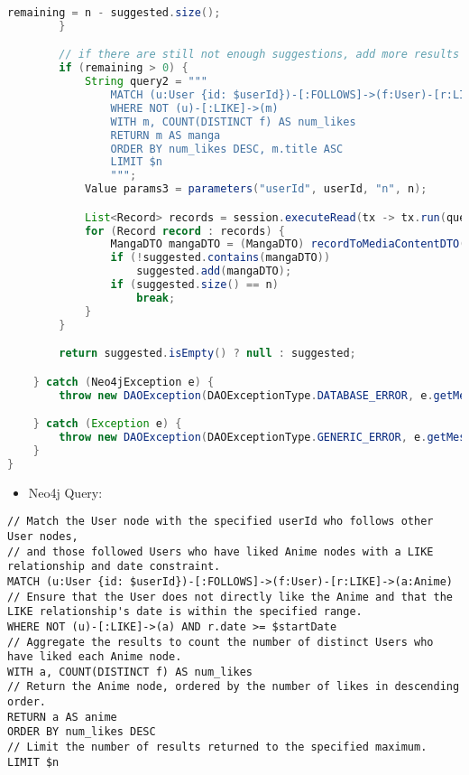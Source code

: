 \begin{mdframed}[style=customstyle]
\begin{lstlisting}[language=java]
            remaining = n - suggested.size();
        }

        // if there are still not enough suggestions, add more results based on all likes
        if (remaining > 0) {
            String query2 = """
                MATCH (u:User {id: $userId})-[:FOLLOWS]->(f:User)-[r:LIKE]->(m:Manga)
                WHERE NOT (u)-[:LIKE]->(m)
                WITH m, COUNT(DISTINCT f) AS num_likes
                RETURN m AS manga
                ORDER BY num_likes DESC, m.title ASC
                LIMIT $n
                """;
            Value params3 = parameters("userId", userId, "n", n);

            List<Record> records = session.executeRead(tx -> tx.run(query2, params3).list());
            for (Record record : records) {
                MangaDTO mangaDTO = (MangaDTO) recordToMediaContentDTO(record);
                if (!suggested.contains(mangaDTO))
                    suggested.add(mangaDTO);
                if (suggested.size() == n)
                    break;
            }
        }

        return suggested.isEmpty() ? null : suggested;

    } catch (Neo4jException e) {
        throw new DAOException(DAOExceptionType.DATABASE_ERROR, e.getMessage());

    } catch (Exception e) {
        throw new DAOException(DAOExceptionType.GENERIC_ERROR, e.getMessage());
    }
}\end{lstlisting}
\end{mdframed}

\begin{itemize}
    \item Neo4j Query:
\end{itemize}

\begin{mdframed}[style=customstyle]
\begin{lstlisting}[language=Cypher]
// Match the User node with the specified userId who follows other User nodes,
// and those followed Users who have liked Anime nodes with a LIKE relationship and date constraint.
MATCH (u:User {id: $userId})-[:FOLLOWS]->(f:User)-[r:LIKE]->(a:Anime)
// Ensure that the User does not directly like the Anime and that the LIKE relationship's date is within the specified range.
WHERE NOT (u)-[:LIKE]->(a) AND r.date >= $startDate
// Aggregate the results to count the number of distinct Users who have liked each Anime node.
WITH a, COUNT(DISTINCT f) AS num_likes
// Return the Anime node, ordered by the number of likes in descending order.
RETURN a AS anime
ORDER BY num_likes DESC
// Limit the number of results returned to the specified maximum.
LIMIT $n\end{lstlisting}
\end{mdframed}

